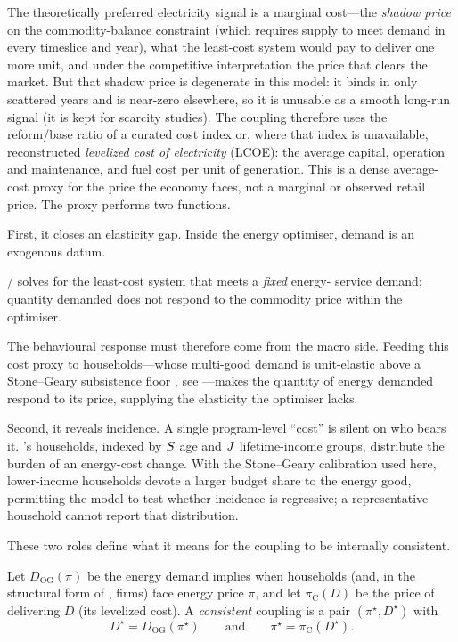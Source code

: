 The theoretically preferred electricity signal is a marginal cost---the \emph{shadow
price} on the \OSeMOSYS{} commodity-balance
constraint \citep{howells_osemosys_2011} (which requires supply to meet demand in every
timeslice and year), what the least-cost system would pay to deliver one more unit, and
under the competitive interpretation the price that clears the market. But that shadow
price is degenerate in this model: it binds in only scattered years and is near-zero
elsewhere, so it is unusable as a smooth long-run signal (it is kept for scarcity
studies). The coupling therefore uses the reform/base ratio of a curated cost index or,
where that index is unavailable, reconstructed \emph{levelized cost of electricity}
(LCOE): the average capital, operation and maintenance, and fuel cost per unit of
generation. This is a dense average-cost proxy for the price the economy faces, not a
marginal or observed retail price. The proxy performs two functions.

First, it closes an elasticity gap. Inside the energy optimiser, demand is an
exogenous datum.

\begin{assumption}
\label{ass:inelastic}
\CLEWS{}/\OSeMOSYS{} solves for the least-cost system that meets a \emph{fixed} energy-
service demand; quantity demanded does not respond to the commodity price within the
optimiser.
\end{assumption}

\noindent The behavioural response must therefore come from the macro side. Feeding
this cost proxy to \OGCore{} households---whose multi-good demand is unit-elastic above a
Stone--Geary subsistence floor \citep{stone_1954}, see ---makes the
quantity of energy demanded respond to its price, supplying the elasticity the
optimiser lacks.

Second, it reveals incidence. A single program-level ``cost'' is silent on who bears
it. \OGCore{}'s households, indexed by $S$ age and $J$ lifetime-income groups,
distribute the burden of an energy-cost change. With the Stone--Geary calibration used
here, lower-income households devote a larger budget share to the energy good, permitting
the model to test whether incidence is regressive; a representative household cannot
report that distribution.

These two roles define what it means for the coupling to be internally consistent.

\begin{definition}
\label{def:fixedpoint}
Let $D_{\text{OG}}(\pi)$ be the energy demand \OGCore{} implies when households (and,
in the structural form of , firms) face energy price $\pi$, and let
$\pi_{\text{C}}(D)$ be the \CLEWS{} price of delivering $D$ (its levelized cost). A \emph{consistent} coupling is a pair $(\pi^\star, D^\star)$ with
\[
  D^\star = D_{\text{OG}}(\pi^\star)
  \qquad\text{and}\qquad
  \pi^\star = \pi_{\text{C}}(D^\star).
\]
\end{definition}

